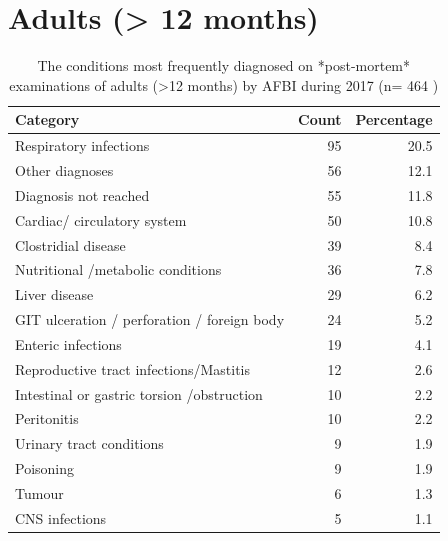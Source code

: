 \documentclass[]{book}
\begin{document}
\section{Adults (\textgreater{} 12 months)}\label{adults-12-months}

\begin{table}

\caption{\label{tab:unnamed-chunk-16}The conditions most frequently diagnosed on *post-mortem* examinations of adults (>12 months) by AFBI during 2017 (n= 464 )}
\centering
\begin{tabular}[t]{l|r|r}
\hline
Category & Count & Percentage\\
\hline
Respiratory infections & 95 & 20.5\\
\hline
Other diagnoses & 56 & 12.1\\
\hline
Diagnosis not reached & 55 & 11.8\\
\hline
Cardiac/ circulatory system & 50 & 10.8\\
\hline
Clostridial disease & 39 & 8.4\\
\hline
Nutritional /metabolic conditions & 36 & 7.8\\
\hline
Liver disease & 29 & 6.2\\
\hline
GIT ulceration / perforation / foreign body & 24 & 5.2\\
\hline
Enteric infections & 19 & 4.1\\
\hline
Reproductive tract infections/Mastitis & 12 & 2.6\\
\hline
Intestinal or gastric torsion /obstruction & 10 & 2.2\\
\hline
Peritonitis & 10 & 2.2\\
\hline
Urinary tract conditions & 9 & 1.9\\
\hline
Poisoning & 9 & 1.9\\
\hline
Tumour & 6 & 1.3\\
\hline
CNS infections & 5 & 1.1\\
\hline
\end{tabular}
\end{table}
\end{document}
